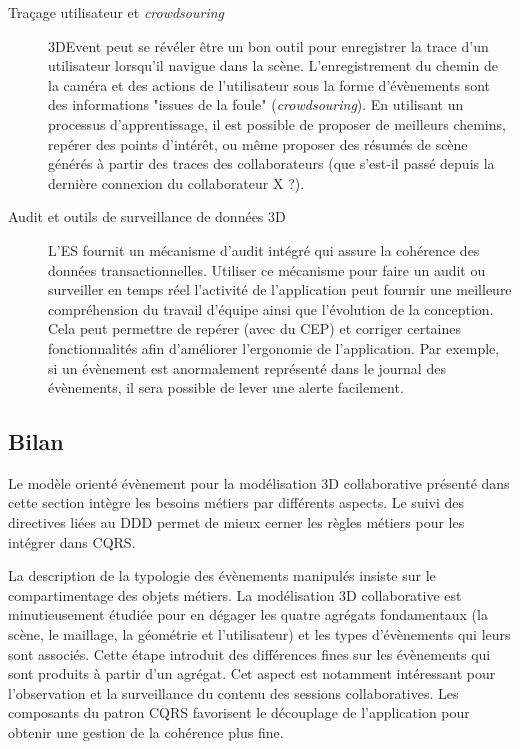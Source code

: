 \begin{description}
	\item[Traçage utilisateur et \textit{crowdsouring}] 3DEvent peut se révéler être 
	un bon outil pour enregistrer la trace d'un utilisateur lorsqu'il navigue dans la 
	scène. L'enregistrement du chemin de la caméra et des actions de l'utilisateur sous la forme d'évènements sont des informations 
	"issues de la foule" (\textit{crowdsouring}). En utilisant un processus 
	d'apprentissage, il est possible de proposer de meilleurs chemins, repérer des 
	points d'intérêt, ou même proposer des résumés de scène générés à partir des 
	traces des collaborateurs (que s'est-il passé depuis la dernière connexion du 
	collaborateur X ?).
	\item[Audit et outils de surveillance de données 3D] L'\gls{ES} fournit un 
	mécanisme 
	d'audit intégré qui assure la cohérence des données transactionnelles. Utiliser 
	ce mécanisme pour faire un audit ou surveiller en temps réel l'activité de 
	l'application peut fournir une meilleure compréhension du travail d'équipe ainsi 
	que l'évolution de la conception. Cela peut permettre de repérer (avec du 
	\gls{CEP}) et corriger certaines fonctionnalités afin d'améliorer l'ergonomie de 
	l'application. Par exemple, si un évènement est anormalement représenté dans 
	le journal des évènements, il sera possible de lever une alerte facilement.
\end{description}
\subsection{Bilan}

Le modèle orienté évènement pour la modélisation 3D collaborative présenté dans 
cette section intègre les besoins métiers par différents aspects. Le suivi des 
directives liées au \gls{DDD} permet de mieux cerner les règles 
métiers pour les intégrer dans \gls{CQRS}. 

La description de la typologie des 
évènements manipulés insiste sur le compartimentage des objets métiers. La 
modélisation 3D collaborative est minutieusement étudiée pour en dégager les quatre 
agrégats fondamentaux (la scène, le maillage, la géométrie et l'utilisateur) et les 
types d'évènements qui leurs sont associés. Cette étape introduit des différences 
fines sur les évènements qui sont produits à partir d'un agrégat. 
Cet aspect est notamment intéressant pour l'observation et la surveillance du 
contenu des sessions collaboratives.
Les composants du patron \gls{CQRS} favorisent le découplage de l'application 
pour obtenir une gestion de la cohérence plus fine. 

